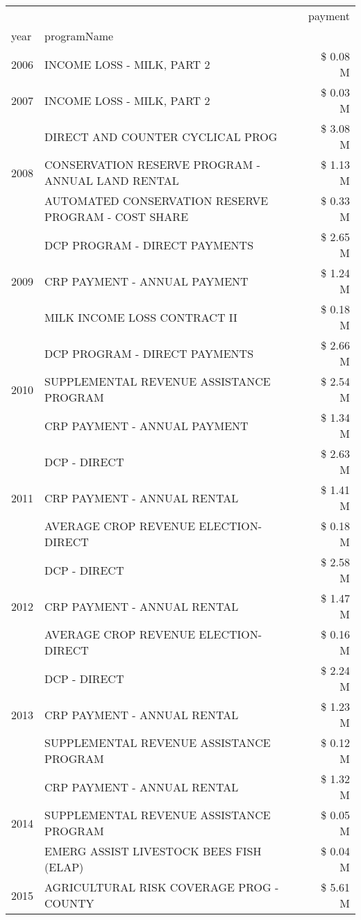 \begin{tabular}{llr}
\toprule
 &  & payment \\
year & programName &  \\
\midrule
2006 & INCOME LOSS - MILK, PART 2 & \$ 0.08 M \\
\cline{1-3}
2007 & INCOME LOSS - MILK, PART 2 & \$ 0.03 M \\
\cline{1-3}
\multirow[t]{3}{*}{2008} & DIRECT AND COUNTER CYCLICAL PROG & \$ 3.08 M \\
 & CONSERVATION RESERVE PROGRAM - ANNUAL LAND RENTAL & \$ 1.13 M \\
 & AUTOMATED CONSERVATION RESERVE PROGRAM - COST SHARE & \$ 0.33 M \\
\cline{1-3}
\multirow[t]{3}{*}{2009} & DCP PROGRAM - DIRECT PAYMENTS & \$ 2.65 M \\
 & CRP PAYMENT - ANNUAL PAYMENT & \$ 1.24 M \\
 & MILK INCOME LOSS CONTRACT II & \$ 0.18 M \\
\cline{1-3}
\multirow[t]{3}{*}{2010} & DCP PROGRAM - DIRECT PAYMENTS & \$ 2.66 M \\
 & SUPPLEMENTAL REVENUE ASSISTANCE PROGRAM & \$ 2.54 M \\
 & CRP PAYMENT - ANNUAL PAYMENT & \$ 1.34 M \\
\cline{1-3}
\multirow[t]{3}{*}{2011} & DCP - DIRECT & \$ 2.63 M \\
 & CRP PAYMENT - ANNUAL RENTAL & \$ 1.41 M \\
 & AVERAGE CROP REVENUE ELECTION-DIRECT & \$ 0.18 M \\
\cline{1-3}
\multirow[t]{3}{*}{2012} & DCP - DIRECT & \$ 2.58 M \\
 & CRP PAYMENT - ANNUAL RENTAL & \$ 1.47 M \\
 & AVERAGE CROP REVENUE ELECTION-DIRECT & \$ 0.16 M \\
\cline{1-3}
\multirow[t]{3}{*}{2013} & DCP - DIRECT & \$ 2.24 M \\
 & CRP PAYMENT - ANNUAL RENTAL & \$ 1.23 M \\
 & SUPPLEMENTAL REVENUE ASSISTANCE PROGRAM & \$ 0.12 M \\
\cline{1-3}
\multirow[t]{3}{*}{2014} & CRP PAYMENT - ANNUAL RENTAL & \$ 1.32 M \\
 & SUPPLEMENTAL REVENUE ASSISTANCE PROGRAM & \$ 0.05 M \\
 & EMERG ASSIST LIVESTOCK BEES FISH (ELAP) & \$ 0.04 M \\
\cline{1-3}
\multirow[t]{3}{*}{2015} & AGRICULTURAL RISK COVERAGE PROG - COUNTY & \$ 5.61 M \\

\end{tabular}
